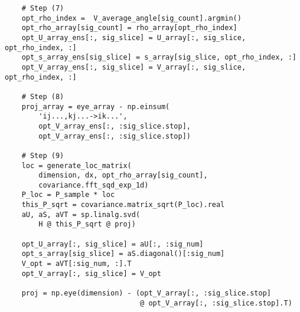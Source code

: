 \documentclass[11pt]{amsart}
\begin{document}
\begin{verbatim}
    # Step (7)
    opt_rho_index =  V_average_angle[sig_count].argmin()
    opt_rho_array[sig_count] = rho_array[opt_rho_index]
    opt_U_array_ens[:, sig_slice] = U_array[:, sig_slice, opt_rho_index, :]
    opt_s_array_ens[sig_slice] = s_array[sig_slice, opt_rho_index, :]
    opt_V_array_ens[:, sig_slice] = V_array[:, sig_slice, opt_rho_index, :]

    # Step (8)
    proj_array = eye_array - np.einsum(
        'ij...,kj...->ik...',
        opt_V_array_ens[:, :sig_slice.stop],
        opt_V_array_ens[:, :sig_slice.stop])

    # Step (9)
    loc = generate_loc_matrix(
        dimension, dx, opt_rho_array[sig_count],
        covariance.fft_sqd_exp_1d)
    P_loc = P_sample * loc
    this_P_sqrt = covariance.matrix_sqrt(P_loc).real
    aU, aS, aVT = sp.linalg.svd(
        H @ this_P_sqrt @ proj)

    opt_U_array[:, sig_slice] = aU[:, :sig_num]
    opt_s_array[sig_slice] = aS.diagonal()[:sig_num]
    V_opt = aVT[:sig_num, :].T
    opt_V_array[:, sig_slice] = V_opt

    proj = np.eye(dimension) - (opt_V_array[:, :sig_slice.stop]
                                @ opt_V_array[:, :sig_slice.stop].T)
\end{verbatim}
\end{document}
